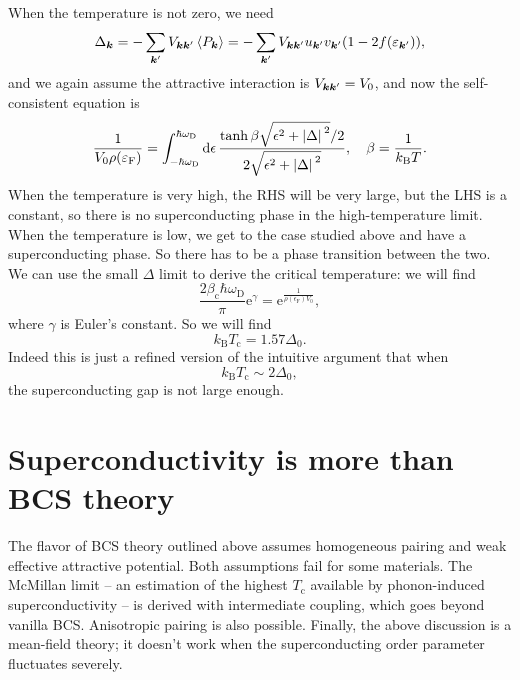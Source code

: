 \documentclass[hyperref, a4paper]{article}
\newcommand*{\ee}{\mathrm{e}}
\newcommand*{\kB}{k_{\text{B}}}
\newcommand*{\Tc}{T_{\text{c}}}
\begin{document}
When the temperature is not zero, we need 
\begin{equation}
    \Delta_{\vb*{k}} = - \sum_{\vb*{k}'} V_{\vb*{k} \vb*{k}'} \expval*{P_{\vb*{k}}}
    = - \sum_{\vb*{k}'} V_{\vb*{k} \vb*{k}'} 
    u_{\vb*{k}'} v_{\vb*{k}'} (1 - 2 f(\varepsilon_{\vb*{k}'})),
\end{equation}
and we again assume the attractive interaction is $V_{\vb*{k} \vb*{k}'} = V_0$,
and now the self-consistent equation is 
\begin{equation}
    \frac{1}{V_0 \rho(\varepsilon_{\text{F}})}  
    = \int_{- \hbar \omega_{\text{D}}}^{ \hbar \omega_{\text{D}}} \dd{\epsilon}
    \frac{
        \tanh \beta \sqrt{\epsilon^2 + \abs*{\Delta}^2} / 2
    }{
        2 \sqrt{\epsilon^2 + \abs*{\Delta}^2}
    }, \quad \beta = \frac{1}{\kB T}.
\end{equation}
When the temperature is very high, 
the RHS will be very large,
but the LHS is a constant,
so there is no superconducting phase in the high-temperature limit.
When the temperature is low, 
we get to the case studied above 
and have a superconducting phase.
So there has to be a phase transition between the two.
We can use the small $\Delta$ limit to derive the critical temperature:
we will find 
\begin{equation}
    \frac{2 \beta_{\text{c}} \hbar \omega_{\text{D}}}{\pi} \ee^{\gamma}
    = \ee^{\frac{1}{\rho(\epsilon_{\text{F}}) V_0} },
\end{equation}
where $\gamma$ is Euler's constant.
So we will find 
\begin{equation}
    k_{\text{B}} T_\text{c} = 1.57 \Delta_0.
\end{equation}
Indeed this is just a refined version of the intuitive argument that when 
\begin{equation}
    \kB \Tc \sim 2 \Delta_0,
\end{equation}
the superconducting gap is not large enough.

\section{Superconductivity is more than BCS theory}

The flavor of BCS theory outlined above assumes 
homogeneous pairing and weak effective attractive potential.
Both assumptions fail for some materials.
The McMillan limit -- an estimation of the highest $\Tc$ available 
by phonon-induced superconductivity -- 
is derived with intermediate coupling, 
which goes beyond vanilla BCS.
Anisotropic pairing is also possible.
Finally, the above discussion is a mean-field theory;
it doesn't work when the superconducting order parameter fluctuates severely.
\end{document}
